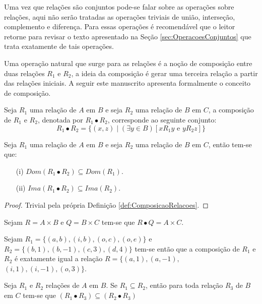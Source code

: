 Uma vez que relações são conjuntos pode-se falar sobre as operações sobre relações, aqui não serão tratadas as operações triviais de união, interseção, complemento e diferença. Para essas operações é recomendável que o leitor retorne para revisar o texto apresentado na Seção \ref{sec:OperacoesConjuntos} que trata exatamente de tais operações. 

Uma operação natural que surge para as relações é a noção de composição entre duas relações $R_1$ e $R_2$, a ideia da composição é gerar uma terceira relação a partir das relações iniciais. A seguir este manuscrito apresenta formalmente o conceito de composição.

\begin{definition}\label{def:ComposicaoRelacoes}
	Seja $R_1$ uma relação de $A$ em $B$ e seja $R_2$ uma relação de $B$ em $C$, a composição de $R_1$ e $R_2$, denotada por $R_1 \bullet R_2$, corresponde ao seguinte conjunto:
	$$R_1 \bullet R_2 = \{(x, z) \mid (\exists y \in B)[x\mathrel{R_1}y \text{ e } y\mathrel{R_2}z] \}$$ 
\end{definition}

\begin{proposition}
	Seja $R_1$ uma relação de $A$ em $B$ e seja $R_2$ uma relação de $B$ em $C$, então tem-se que:
	\begin{itemize}
		\item[(i)] $Dom(R_1 \bullet R_2) \subseteq Dom(R_1)$.
		\item[(ii)] $Ima(R_1 \bullet R_2) \subseteq Ima(R_2)$.
	\end{itemize}
\end{proposition}

\begin{proof}
	Trivial pela própria Definição \ref{def:ComposicaoRelacoes}.
\end{proof}

\begin{example}
	Sejam $R = A \times B$ e $Q = B \times C$ tem-se que $R \bullet Q = A \times C$.
\end{example}

\begin{example}
	Sejam $R_1 = \{(a, b), (i, b), (o, c), (o, e)\}$ e $R_2 = \{(b, 1), (b, -1), (c, 3), (d, 4)\}$ tem-se então que a composição de $R_1$ e $R_2$ é exatamente igual a relação $R = \{(a, 1), (a, -1),$ $(i, 1), (i, -1), (o, 3)\}$.
\end{example}

\begin{theorem}\label{teo:MonotonicidadeComposicaoRelacoes}
	Seja $R_1$ e $R_2$ relações de $A$ em $B$. Se $R_1 \subseteq R_2$, então para toda relação $R_3$ de $B$ em $C$ tem-se que $(R_1 \bullet R_3) \subseteq (R_2 \bullet R_3)$
\end{theorem}

